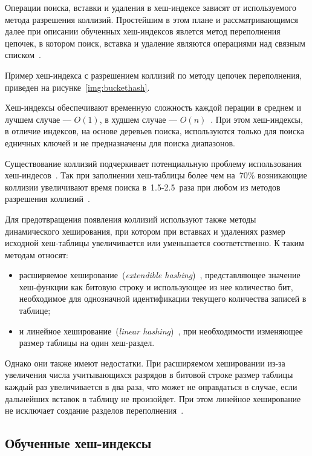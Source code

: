 Операции поиска, вставки и удаления в хеш-индексе зависят от используемого
метода разрешения коллизий. Простейшим в этом плане и рассматривающимся далее
при описании обученных хеш-индексов явлется метод переполнения цепочек, в
котором поиск, вставка и удаление являются операциями над связным
списком~\cite{baw}.

Пример хеш-индекса с разрешением коллизий по методу цепочек переполнения,
приведен на рисунке~\ref{img:buckethash}.


Хеш-индексы обеспечивают временную сложность каждой перации в
среднем и лучшем случае --- $O(1)$, в худшем случае --- $O(n)$~\cite{squares}.
При этом хеш-индексы, в отличие индексов, на основе деревьев поиска,
используются только для поиска едничных ключей и не предназначены для поиска
диапазонов.

Существование коллизий подчеркивает потенциальную проблему использования
хеш-индесов~\cite{squares}. Так при заполнении хеш-таблицы более чем на~$70\%$
возникающие коллизии увеличивают время поиска в~1.5-2.5~раза при любом из
методов разрешения коллизий~\cite{baw}.

Для предотвращения появления коллизий используют также методы динамического
хеширования, при котором при вставках и удалениях размер исходной хеш-таблицы
увеличивается или уменьшается соответственно. К таким методам относят:
\begin{itemize}
    \item расширяемое хеширование~(\textit{extendible hashing})~\cite{encycl},
        представляющее значение хеш-функции как битовую строку и использующее из
        нее количество бит, необходимое для однозначной идентификации текущего
        количества записей в таблице;
    \item и линейное хеширование~(\textit{linear hashing})~\cite{encycl}, при
        необходимости изменяющее размер таблицы на один хеш-раздел.
\end{itemize}

Однако они также имеют недостатки. При расширяемом хешировании из-за увеличения
числа учитывающихся разрядов в битовой строке размер таблицы каждый раз
увеличивается в два раза, что может не оправдаться в случае, если дальнейших
вставок в таблицу не произойдет. При этом линейное хеширование не исключает
создание разделов переполнения~\cite{encycl}.

\subsection{Обученные хеш-индексы}

